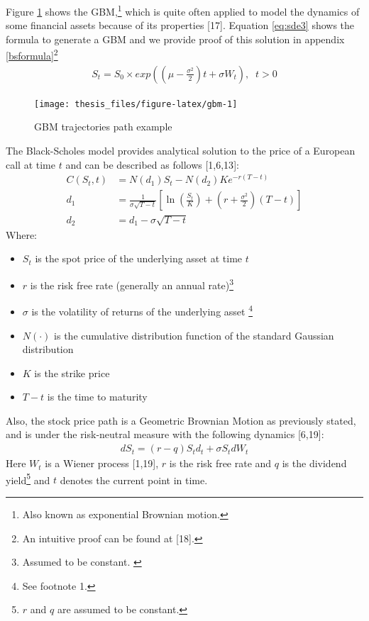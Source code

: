 \documentclass[12pt,oneside]{reedthesis}
\providecommand{\tightlist}{%
  \setlength{\itemsep}{0pt}\setlength{\parskip}{0pt}}
\theoremstyle{definition}
\theoremstyle{definition}
\theoremstyle{remark}
\begin{document}
  Figure \ref{fig:gbm} shows the GBM,\footnote{Also known as exponential
    Brownian motion.} which is quite often applied to model the dynamics
  of some financial assets because of its properties {[}17{]}. Equation
  \eqref{eq:sde3} shows the formula to generate a GBM and we provide proof
  of this solution in appendix \ref{bsformula}\footnote{An intuitive proof
    can be found at {[}18{]}.}
  \begin{align} \label{eq:sde3}
  S_t = S_0 \times exp{\left( \left( \mu - \frac{\sigma^2}{2} \right) t + \sigma W_t \right)}, \;\; t > 0
  \end{align}
  \begin{figure}
  
  {\centering \texttt{[image: thesis\_files/figure-latex/gbm-1]} 
  
  }
  
  \caption{GBM trajectories path example \label{gbm}}\label{fig:gbm}
  \end{figure}
  The Black-Scholes model provides analytical solution to the price of a
  European call at time \(t\) and can be described as follows
  {[}1,6,13{]}:
  \begin{align}
  C(S_{t},t)&=N(d_{1})S_{t}-N(d_{2})Ke^{-r(T-t)}\\[10pt]
  d_{1}&={\frac {1}{\sigma {\sqrt {T-t}}}}\left[\ln \left({\frac {S_{t}}{K}}\right)+\left(r+{\frac {\sigma ^{2}}{2}}\right)(T-t)\right]\\[10pt]
  d_{2}&=d_{1}-\sigma {\sqrt {T-t}}
  \end{align}
  \noindent
  Where:
  \begin{itemize}
  \tightlist
  \item
    \(S_{t}\) is the spot price of the underlying asset at time \(t\)
  \item
    \(r\) is the risk free rate (generally an annual
    rate)\footnote{Assumed to be constant. \label{teste}}
  \item
    \(\sigma\) is the volatility of returns of the underlying asset
    \footnote{See footnote 1.}
  \item
    \(N(\cdot )\) is the cumulative distribution function of the standard
    Gaussian distribution
  \item
    \(K\) is the strike price
  \item
    \(T-t\) is the time to maturity
  \end{itemize}
  \noindent
  Also, the stock price path is a Geometric Brownian Motion as previously
  stated, and is under the risk-neutral measure with the following
  dynamics {[}6,19{]}:
  \begin{align}
  dS_{t} = (r-q)S_td_t+\sigma S_t dW_t
  \end{align}
  \noindent
  Here \(W_t\) is a Wiener process {[}1,19{]}, \(r\) is the risk free rate
  and \(q\) is the dividend
  yield\footnote{$r$ and $q$ are assumed to be constant.} and \(t\)
  denotes the current point in time.
  
\end{document}
